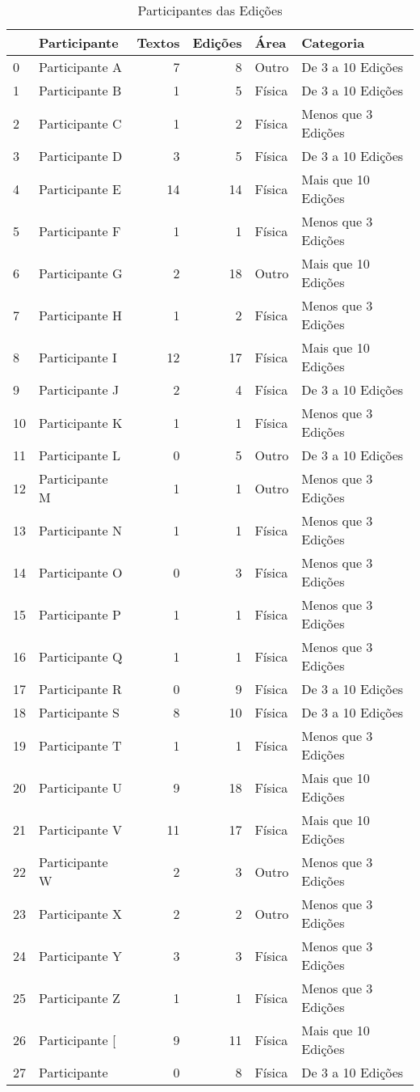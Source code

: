 \begin{table}
\caption{Participantes das Edições}
\label{tab:dados_participantes}
\begin{tabular}{llrrll}
\toprule
 & Participante & Textos & Edições & Área & Categoria \\
\midrule
0 & Participante A & 7 & 8 & Outro & De 3 a 10 Edições \\
1 & Participante B & 1 & 5 & Física & De 3 a 10 Edições \\
2 & Participante C & 1 & 2 & Física & Menos que 3 Edições \\
3 & Participante D & 3 & 5 & Física & De 3 a 10 Edições \\
4 & Participante E & 14 & 14 & Física & Mais que 10 Edições \\
5 & Participante F & 1 & 1 & Física & Menos que 3 Edições \\
6 & Participante G & 2 & 18 & Outro & Mais que 10 Edições \\
7 & Participante H & 1 & 2 & Física & Menos que 3 Edições \\
8 & Participante I & 12 & 17 & Física & Mais que 10 Edições \\
9 & Participante J & 2 & 4 & Física & De 3 a 10 Edições \\
10 & Participante K & 1 & 1 & Física & Menos que 3 Edições \\
11 & Participante L & 0 & 5 & Outro & De 3 a 10 Edições \\
12 & Participante M & 1 & 1 & Outro & Menos que 3 Edições \\
13 & Participante N & 1 & 1 & Física & Menos que 3 Edições \\
14 & Participante O & 0 & 3 & Física & Menos que 3 Edições \\
15 & Participante P & 1 & 1 & Física & Menos que 3 Edições \\
16 & Participante Q & 1 & 1 & Física & Menos que 3 Edições \\
17 & Participante R & 0 & 9 & Física & De 3 a 10 Edições \\
18 & Participante S & 8 & 10 & Física & De 3 a 10 Edições \\
19 & Participante T & 1 & 1 & Física & Menos que 3 Edições \\
20 & Participante U & 9 & 18 & Física & Mais que 10 Edições \\
21 & Participante V & 11 & 17 & Física & Mais que 10 Edições \\
22 & Participante W & 2 & 3 & Outro & Menos que 3 Edições \\
23 & Participante X & 2 & 2 & Outro & Menos que 3 Edições \\
24 & Participante Y & 3 & 3 & Física & Menos que 3 Edições \\
25 & Participante Z & 1 & 1 & Física & Menos que 3 Edições \\
26 & Participante [ & 9 & 11 & Física & Mais que 10 Edições \\
27 & Participante \ & 0 & 8 & Física & De 3 a 10 Edições \\
\bottomrule
\end{tabular}
\end{table}
